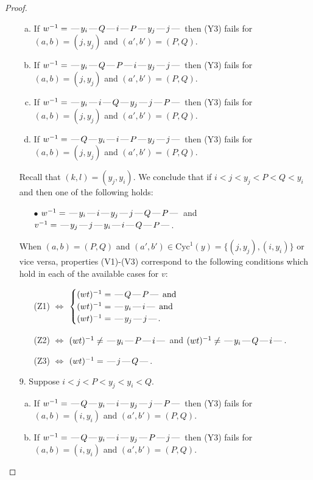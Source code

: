 \documentclass[10pt]{article}
\theoremstyle{definition}
\theoremstyle{definition}
\def\dash{\text{\hspace{0.5mm}---\hspace{0.5mm}}}
\def\Cyc{\mathrm{Cyc}}
\begin{document}
\begin{proof}
\begin{enumerate}
\begin{enumerate}[(a)]
\item If $w^{-1} = \dash y_i\dash Q\dash i\dash P\dash y_j\dash j\dash $ then (Y3) fails for $(a,b)=(j,y_j)$ and $(a',b')=(P,Q)$.
\item If $w^{-1} = \dash y_i\dash Q\dash P\dash i\dash y_j\dash j\dash $ then (Y3) fails for $(a,b)=(j,y_j)$ and $(a',b')=(P,Q)$.
\item If $w^{-1} = \dash y_i\dash i\dash Q\dash y_j\dash j\dash P\dash $ then (Y3) fails for $(a,b)=(j,y_j)$ and $(a',b')=(P,Q)$.
\item If $w^{-1} = \dash Q\dash y_i\dash i\dash P\dash y_j\dash j\dash $ then (Y3) fails for $(a,b)=(j,y_j)$ and $(a',b')=(P,Q)$.
\end{enumerate}
Recall that $(k,l) = (y_j,y_i)$.
We conclude that if $i < j < y_j < P < Q < y_i$ and then one of the following holds:
\begin{enumerate}
\item[$\bullet$] $w^{-1} = \dash y_i\dash i\dash y_j\dash j\dash Q\dash P\dash $ and $v^{-1} = \dash y_j\dash j\dash y_i\dash i\dash Q\dash P\dash $.
\end{enumerate}
When $(a,b)= (P,Q)$ and $(a',b')\in \Cyc^1(y)=\{(j,y_j),(i,y_i)\}$ or vice versa,
properties (V1)-(V3) correspond to the following conditions which hold in
each of the available cases for $v$:
\begin{enumerate}
\item[](Z1) $\Leftrightarrow$ $\begin{cases}\text{$(wt)^{-1} = \dash Q \dash P \dash$}\text{ and }\\
\text{$(wt)^{-1} = \dash y_i \dash i \dash$}\text{ and }\\
\text{$(wt)^{-1} = \dash y_j \dash j \dash$}.\end{cases}$
\item[](Z2) $\Leftrightarrow$ $(wt)^{-1} \neq \dash y_i \dash P \dash i \dash$ and $(wt)^{-1}\neq \dash y_i \dash Q \dash i \dash$.
\item[](Z3) $\Leftrightarrow$ $(wt)^{-1} = \dash j \dash Q \dash$.
\end{enumerate}
\item[$9$.] Suppose $i < j < P < y_j < y_i < Q$.
\begin{enumerate}[(a)]
\item If $w^{-1} = \dash Q\dash y_i\dash i\dash y_j\dash j\dash P\dash $ then (Y3) fails for $(a,b)=(i,y_i)$ and $(a',b')=(P,Q)$.
\item If $w^{-1} = \dash Q\dash y_i\dash i\dash y_j\dash P\dash j\dash $ then (Y3) fails for $(a,b)=(i,y_i)$ and $(a',b')=(P,Q)$.

\end{enumerate}
\end{enumerate}
\end{proof}
\end{document}
